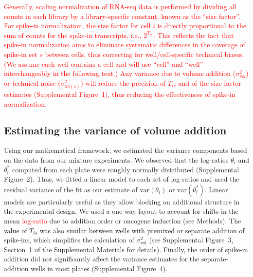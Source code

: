 \documentclass{article}
\newcommand{\suppfigschem}{1}
\newcommand{\suppfignorm}{2}
\newcommand{\suppfigtotals}{3}
\newcommand{\suppfigorder}{4}
\newcommand{\suppsecmath}{1}
\newcommand{\revised}[1]{\textcolor{red}{#1}}
\newcommand\variance{\mbox{var}}
\begin{document}
\revised{Generally, scaling normalization of RNA-seq data is performed by dividing all counts in each library by a library-specific constant, known as the ``size factor''.
For spike-in normalization, the size factor for cell $i$ is directly proportional to the sum of counts for the spike-in transcripts, i.e., $2^{T_{is}}$.
This reflects the fact that spike-in normalization aims to eliminate systematic differences in the coverage of spike-in set $s$ between cells, thus correcting for well/cell-specific technical biases.
(We assume each well contains a cell and will use ``cell'' and ``well'' interchangeably in the following text.)
Any variance due to volume addition ($\sigma^2_{vol}$) or technical noise ($\sigma^2_{lib(s)}$) will reduce the precision of $T_{is}$ and of the size factor estimates (Supplemental Figure~\suppfigschem{}), thus reducing the effectiveness of spike-in normalization.
}

\subsection*{Estimating the variance of volume addition}
Using our mathematical framework, we estimated the variance components based on the data from our mixture experiments.
We observed that the log-ratios $\theta_i$ and $\theta^*_i$ computed from each plate were roughly normally distributed (Supplemental Figure~\suppfignorm{}).
Thus, we fitted a linear model to each set of log-ratios and used the residual variance of the fit as our estimate of $\variance(\theta_i)$ or $\variance(\theta^*_i)$.
Linear models are particularly useful as they allow blocking on additional structure in the experimental design.
We used a one-way layout to account for shifts in the mean \revised{log-ratio} due to addition order or oncogene induction (see Methods).
The value of $T_{is}$ was also similar between wells with premixed or separate addition of spike-ins, which simplifies the calculation of $\sigma^2_{vol}$ (see Supplemental Figure~\suppfigtotals{}, Section~\suppsecmath{} of the Supplemental Materials for details).
Finally, the order of spike-in addition did not significantly affect the variance estimates for the separate-addition wells in most plates (Supplemental Figure~\suppfigorder{}).
\end{document}
